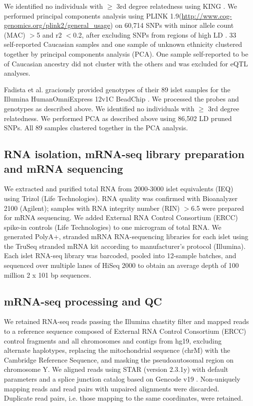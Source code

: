 We identified no individuals with $\geq$ 3rd degree relatedness using KING \cite{manichaikulRobustRelationshipInference2010}. We performed principal components analysis using PLINK 1.9(\url{http://www.cog-genomics.org/plink2/general\_usage}) on 60,714 SNPs with minor allele count (MAC) $>$5 and r2 $<$0.2, after excluding SNPs from regions of high LD \cite{priceLongRangeLDCan2008}. 33 self-reported Caucasian samples and one sample of unknown ethnicity clustered together by principal components analysis (PCA). One sample self-reported to be of Caucasian ancestry did not cluster with the others and was excluded for eQTL analyses. 

Fadista et al. graciously provided genotypes of their 89 islet samples for the Illumina HumanOmniExpress 12v1C BeadChip \cite{fadistaGlobalGenomicTranscriptomic2014}. We processed the probes and genotypes as described above.  We identified no individuals with $\geq$ 3rd degree relatedness. We performed PCA as described above using 86,502 LD pruned SNPs. All 89 samples clustered together in the PCA analysis.

\subsection{RNA isolation, mRNA-seq library preparation and mRNA sequencing} 
We extracted and purified total RNA from 2000-3000 islet equivalents (IEQ) using Trizol (Life Technologies). RNA quality was confirmed with Bioanalyzer 2100 (Agilent); samples with RNA integrity number (RIN) $>$6.5 were prepared for mRNA sequencing. We added External RNA Control Consortium (ERCC) spike-in controls (Life Technologies) to one microgram of total RNA.  We generated PolyA+, stranded mRNA RNA-sequencing libraries for each islet using the TruSeq stranded mRNA kit according to manufacturer’s protocol (Illumina).  Each islet RNA-seq library was barcoded, pooled into 12-sample batches, and sequenced over multiple lanes of HiSeq 2000 to obtain an average depth of 100 million 2 x 101 bp sequences.

\subsection{mRNA-seq processing and QC}
We retained RNA-seq reads passing the Illumina chastity filter and mapped reads to a reference sequence composed of External RNA Control Consortium (ERCC) control fragments and all chromosomes and contigs from hg19, excluding alternate haplotypes, replacing the mitochondrial sequence (chrM) with the Cambridge Reference Sequence, and masking the pseudoautosomal region on chromosome Y. We aligned reads using STAR (version 2.3.1y) \cite{dobinSTARUltrafastUniversal2013a} with default parameters and a splice junction catalog based on Gencode v19 \cite{harrowGENCODEReferenceHuman2012}. Non-uniquely mapping reads and read pairs with unpaired alignments were discarded. Duplicate read pairs, i.e. those mapping to the same coordinates, were retained. 

